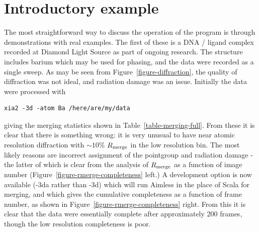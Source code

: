 \documentclass[a4paper, 11pt]{article}
\begin{document}
\section{Introductory example}

The most straightforward way to discuss the operation of the program is 
through demonstrations with real examples. The first of these is a DNA / 
ligand complex recorded at Diamond Light Source as part of ongoing research.
The structure includes barium which may be used for phasing, and the data
were recorded as a single sweep. As may be seen from
Figure~\ref{figure-diffraction}, the quality of diffraction was not
ideal, and radiation damage was an issue. Initially the data were processed with 
\begin{verbatim}
xia2 -3d -atom Ba /here/are/my/data
\end{verbatim}

\noindent
giving the merging statistics shown in Table~\ref{table-merging-full}.
From these it is clear
that there is something wrong: it is very unusual to have near atomic 
resolution diffraction with $\sim 10\%$ $R_{\rm{merge}}$ in the low resolution
bin. The most likely reasons are incorrect assignment of the pointgroup and
radiation damage - the latter of which is clear from the analysis of 
$R_{\rm{merge}}$ as a function of image number
(Figure~\ref{figure-rmerge-completeness} left.) A development 
option is now available (-3da rather than -3d) which will run Aimless in the 
place of Scala for merging, and which gives the cumulative completeness as
a function of frame number, as shown in
Figure~\ref{figure-rmerge-completeness} right. From this it is clear 
that the data were essentially complete after approximately 200
frames, though the low resolution completeness is poor. 
\end{document}
